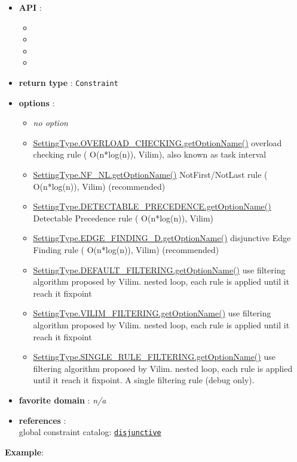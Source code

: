 \begin{itemize}
	\item \textbf{API} :
	\begin{itemize}
		\item {}
		\item {}
		\item {}
		\item {}
	\end{itemize}
	\item \textbf{return type} : \texttt{Constraint}
	\item \textbf{options} :
	\begin{itemize}
		\item \emph{no option}
		\item \hyperlink{cdisjunctiveoc:cdisjunctiveocoptions}{SettingType.OVERLOAD\_CHECKING.getOptionName()} overload checking rule ( O(n*log(n)), Vilim), also known as task interval
		\item \hyperlink{cdisjunctivenfnl:cdisjunctivenfnloptions}{SettingType.NF\_NL.getOptionName()} NotFirst/NotLast rule ( O(n*log(n)), Vilim) (recommended)
		\item \hyperlink{cdisjunctivedp:cdisjunctivedpoptions}{SettingType.DETECTABLE\_PRECEDENCE.getOptionName()} Detectable Precedence rule ( O(n*log(n)), Vilim)
		\item \hyperlink{cdisjunctiveef:cdisjunctiveefoptions}{SettingType.EDGE\_FINDING\_D.getOptionName()} disjunctive Edge Finding rule ( O(n*log(n)), Vilim) (recommended)
		\item \hyperlink{cdisjunctivedf:cdisjunctivedfoptions}{SettingType.DEFAULT\_FILTERING.getOptionName()} use filtering algorithm proposed by Vilim. nested loop, each rule is applied until it reach it fixpoint		
		\item \hyperlink{cdisjunctivedf:cdisjunctivedfoptions}{SettingType.VILIM\_FILTERING.getOptionName()} use filtering algorithm proposed by Vilim. nested loop, each rule is applied until it reach it fixpoint
		\item \hyperlink{cdisjunctivesrf:cdisjunctivesrfoptions}{SettingType.SINGLE\_RULE\_FILTERING.getOptionName()} use filtering algorithm proposed by Vilim. nested loop, each rule is applied until it reach it fixpoint. A single filtering rule (debug only).					
	\end{itemize}
	\item \textbf{favorite domain} : \emph{n/a}
	\item \textbf{references} :\\
      global constraint catalog: \href{http://www.emn.fr/x-info/sdemasse/gccat/Cdisjunctive.html}{\tt disjunctive}
\end{itemize}

\textbf{Example}:
%
